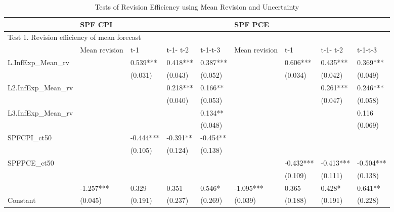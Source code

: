 \documentclass[]{article}
\begin{document}
	\begin{table}[ht]
		\caption{Tests of Revision Efficiency using Mean Revision and Uncertainty}
		\label{RevEfficency}
		\begin{adjustbox}{angle=90}
			
			\begin{tabular}{lllllllll}
				\hline 
				& \multicolumn{4}{l}{SPF CPI}                     & \multicolumn{4}{l}{SPF PCE}                       \\
				\hline 
				\multicolumn{9}{l}{Test 1.  Revision efficiency of mean forecast}            \\
				\hline 
				& Mean revision & t-1       & t-1- t-2 & t-1-t-3  & Mean revision & t-1       & t-1- t-2  & t-1-t-3   \\
				\hline 
				L.InfExp\_Mean\_rv  &               & 0.539***  & 0.418*** & 0.387*** &               & 0.606***  & 0.435***  & 0.369***  \\
				&               & (0.031)   & (0.043)  & (0.052)  &               & (0.034)   & (0.042)   & (0.049)   \\
				L2.InfExp\_Mean\_rv &               &           & 0.218*** & 0.166**  &               &           & 0.261***  & 0.246***  \\
				&               &           & (0.040)  & (0.053)  &               &           & (0.047)   & (0.058)   \\
				L3.InfExp\_Mean\_rv &               &           &          & 0.134**  &               &           &           & 0.116     \\
				&               &           &          & (0.048)  &               &           &           & (0.069)   \\
				SPFCPI\_ct50        &               & -0.444*** & -0.391** & -0.454** &               &           &           &           \\
				&               & (0.105)   & (0.124)  & (0.138)  &               &           &           &           \\
				SPFPCE\_ct50        &               &           &          &          &               & -0.432*** & -0.413*** & -0.504*** \\
				&               &           &          &          &               & (0.109)   & (0.111)   & (0.138)   \\
				& -1.257***     & 0.329     & 0.351    & 0.546*   & -1.095***     & 0.365     & 0.428*    & 0.641**   \\
				Constant & (0.045)       & (0.191)   & (0.237)  & (0.269)  & (0.039)       & (0.188)   & (0.191)   & (0.228)   \\

\end{tabular}
\end{adjustbox}
\end{table}
\end{document}
